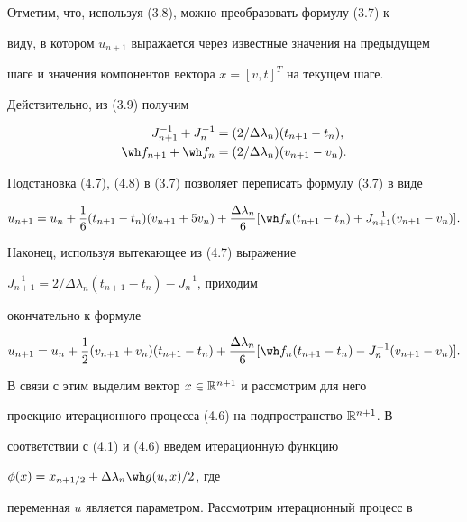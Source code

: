  


Отметим, что, используя (3.8), можно преобразовать формулу (3.7) к 


виду, в котором $u_{n+1}$ выражается через известные значения на предыдущем 


шаге и значения компонентов вектора $x=[v,t]^T$ на текущем шаге. 


Действительно, из (3.9) получим 


\begin{align} 


J^{-1}_{n+1}+J^{-1}_n&=(2/\Delta\lambda_n)(t_{n+1}-t_n),\\ 


\wh f_{n+1}+\wh f_n&=(2/\Delta\lambda_n)(v_{n+1}-v_n). 


\end{align} 


 


Подстановка (4.7), (4.8) в (3.7) позволяет переписать формулу (3.7) в виде 


$$ 


u_{n+1}=u_n+\frac{1}{6}(t_{n+1}-t_n)(v_{n+1}+5v_n)+ 


\frac{\Delta\lambda_n}{6}[\wh f_n(t_{n+1}-t_n)+J^{-1}_{n+1} 


(v_{n+1}-v_n)]. 


$$ 


Наконец, используя вытекающее из (4.7) выражение 


$J^{-1}_{n+1}=2/\Delta\lambda_n(t_{n+1}-t_n)-J^{-1}_n$, приходим 


окончательно к формуле 


\begin{equation} 


u_{n+1}=u_n+\frac{1}{2}(v_{n+1}+v_n)(t_{n+1}-t_n)+ 


\frac{\Delta\lambda_n}{6}[\wh f_n(t_{n+1}-t_n)-J^{-1}_n 


(v_{n+1}-v_n)]. 


\end{equation} 


В связи с этим выделим вектор $x\in\Bbb R^{n+1}$ и рассмотрим для него 


проекцию итерационного процесса (4.6) на подпространство $\Bbb R^{n+1}$. В 


соответствии с (4.1) и (4.6) введем итерационную функцию 


$\phi(x)=x_{n+1/2}+\Delta\lambda_n\wh g(u,x)/2$, где 


переменная $u$ является параметром. Рассмотрим итерационный процесс в 


